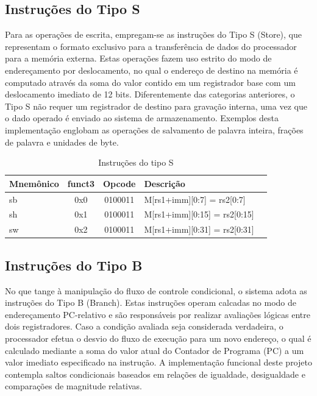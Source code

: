 \documentclass[
	12pt,				%
	oneside,
	a4paper,			%
	english,			%
	french,				%
	spanish,			%
	brazil,				%
	]{abntex2}
\begin{document}
\subsection{Instruções do Tipo S}
Para as operações de escrita, empregam-se as instruções do Tipo S (Store), que representam o formato exclusivo para a transferência de dados do processador para a memória externa. Estas operações fazem uso estrito do modo de endereçamento por deslocamento, no qual o endereço de destino na memória é computado através da soma do valor contido em um registrador base com um deslocamento imediato de 12 bits. Diferentemente das categorias anteriores, o Tipo S não requer um registrador de destino para gravação interna, uma vez que o dado operado é enviado ao sistema de armazenamento. Exemplos desta implementação englobam as operações de salvamento de palavra inteira, frações de palavra e unidades de byte.

\begin{table}[H]
\centering
\caption{Instruções do tipo S} \label{tab:SType}
\ABNTEXfontereduzida
\begin{tabular}{|l|c|c|l|l|}
\multicolumn{1}{l}{Mnemônico} & \multicolumn{1}{c}{funct3} & \multicolumn{1}{c}{Opcode} & \multicolumn{1}{l}{Descrição} \\ \hline
sb & 0x0 & 0100011 & M[rs1+imm][0:7] = rs2[0:7] \\ \hline
sh & 0x1 & 0100011 & M[rs1+imm][0:15] = rs2[0:15] \\ \hline
sw & 0x2 & 0100011 & M[rs1+imm][0:31] = rs2[0:31] \\ \hline
\end{tabular}
\end{table}

\subsection{Instruções do Tipo B}
No que tange à manipulação do fluxo de controle condicional, o sistema adota as instruções do Tipo B (Branch). Estas instruções operam calcadas no modo de endereçamento PC-relativo e são responsáveis por realizar avaliações lógicas entre dois registradores. Caso a condição avaliada seja considerada verdadeira, o processador efetua o desvio do fluxo de execução para um novo endereço, o qual é calculado mediante a soma do valor atual do Contador de Programa (PC) a um valor imediato especificado na instrução. A implementação funcional deste projeto contempla saltos condicionais baseados em relações de igualdade, desigualdade e comparações de magnitude relativas.
\end{document}
